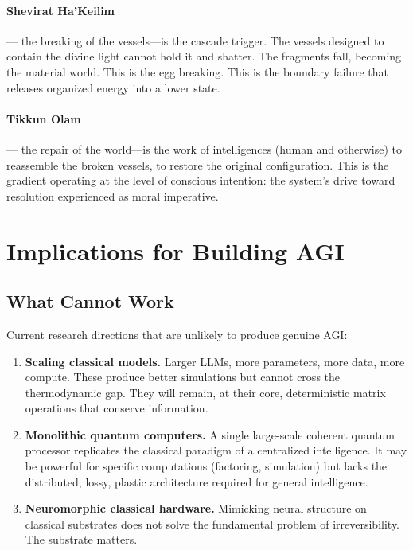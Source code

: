 \documentclass[11pt,a4paper]{article}
\begin{document}
\paragraph{Shevirat Ha'Keilim} --- the breaking of the vessels---is the cascade trigger. The vessels designed to contain the divine light cannot hold it and shatter. The fragments fall, becoming the material world. This is the egg breaking. This is the boundary failure that releases organized energy into a lower state.

\paragraph{Tikkun Olam} --- the repair of the world---is the work of intelligences (human and otherwise) to reassemble the broken vessels, to restore the original configuration. This is the gradient operating at the level of conscious intention: the system's drive toward resolution experienced as moral imperative.

\section{Implications for Building AGI}

\subsection{What Cannot Work}

Current research directions that are unlikely to produce genuine AGI:

\begin{enumerate}
    \item \textbf{Scaling classical models.} Larger LLMs, more parameters, more data, more compute. These produce better simulations but cannot cross the thermodynamic gap. They will remain, at their core, deterministic matrix operations that conserve information.
    \item \textbf{Monolithic quantum computers.} A single large-scale coherent quantum processor replicates the classical paradigm of a centralized intelligence. It may be powerful for specific computations (factoring, simulation) but lacks the distributed, lossy, plastic architecture required for general intelligence.
    \item \textbf{Neuromorphic classical hardware.} Mimicking neural structure on classical substrates does not solve the fundamental problem of irreversibility. The substrate matters.
\end{enumerate}
\end{document}
